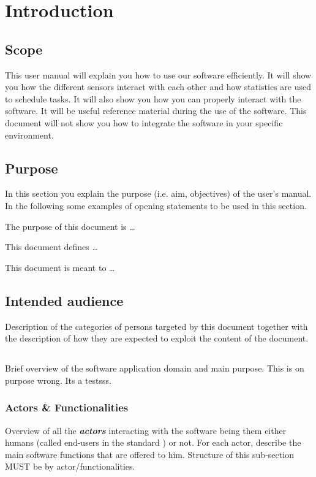 \chapter{Introduction}
\label{chap:introduction}

\section{Scope}
This user manual will explain you how to use our software efficiently. It will show you how the different sensors interact with each other and how statistics are used to schedule tasks. It will also show you how you can properly interact with the software. It will be useful reference material during the use of the software. This document will not show you how to integrate the software in your specific environment. 


\section{Purpose}
In this section you explain the purpose (i.e. aim, objectives) of the user's
manual. In the following some examples of opening statements to be used in this
section.

The purpose of this document is \ldots

This document defines \ldots

This document is meant to \ldots



\section{Intended audience}
Description of the categories of persons targeted by this document together with the description of how they are expected to exploit the content of the document.


\section{\mysystemname}
Brief overview of the software application domain and main purpose.
This is on purpose wrong. Its a testsss.


\subsection{Actors \& Functionalities}
Overview of all the \textbf{\emph{\glspl{actor}}} interacting with the software
being them either humans (called end-users in the standard
\cite{IEEE-2001-userdocumentation}) or not. For each actor, describe the main
software functions that are offered to him. Structure of this sub-section MUST
be by actor/functionalities.


